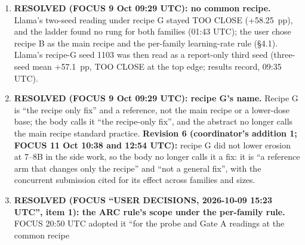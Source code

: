 \documentclass{article}
\theoremstyle{plain}
\theoremstyle{definition}
\theoremstyle{remark}
\begin{document}
\begin{enumerate}
        reports it as a pre-registered prediction that failed''. Revision 4 puts
        its result in \S{}5 (placeholder) and names the run in \S{}4.1 and
        \S{}4.10. Decide whether \S{}5 gives it a sentence or a row in the dose
        table, and whether the mechanism side study keeps any recipe contrast.
        Revision 4 keeps the recipe contrast only as a dose decomposition, not
        as a mechanism test. \textbf{Revision 5:} recipe G is now a reference
        arm, and the token-mean-only run explains that reference's effect on
        OLMo; \S{}4.10 item 2 and \S{}5 keep it. Decide whether \S{}5 gives it a
        sentence or a row beside recipe G. \textbf{Revision 6 (overlap rule):}
        the token-mean-only run is reported by the concurrent submission;
        \S{}4.10 item 2 cites it and \S{}5's placeholder no longer lists it.
        Decide whether the main paper still states this failed pre-registered
        prediction itself (FOCUS 8 Oct 21:36 UTC: ``the paper reports it as a
        pre-registered prediction that failed''), or only through the citation.
  \item \textbf{RESOLVED (FOCUS 9 Oct 09:29 UTC): no common recipe.} Llama's
        two-seed reading under recipe G stayed TOO CLOSE (+58.25~pp), and the
        ladder found no rung for both families (01:43 UTC); the user chose
        recipe B as the main recipe and the per-family learning-rate rule
        (\S{}4.1). Llama's recipe-G seed 1103 was then read as a report-only
        third seed (three-seed mean +57.1~pp, TOO CLOSE at the top edge; results
        record, 09:35 UTC).
  \item \textbf{RESOLVED (FOCUS 9 Oct 09:29 UTC): recipe G's name.} Recipe G is
        ``the recipe only fix'' and a reference, not the main recipe or a
        lower-dose base; the body calls it ``the recipe-only fix'', and the
        abstract no longer calls the main recipe standard practice.
        \textbf{Revision 6 (coordinator's addition 1; FOCUS 11 Oct 10:38 and
        12:54 UTC):} recipe G did not lower erosion at 7--8B in the side work,
        so the body no longer calls it a fix: it is ``a reference arm that
        changes only the recipe'' and ``not a general fix'', with the concurrent
        submission cited for its effect across families and sizes.
  \item \textbf{RESOLVED (FOCUS ``USER DECISIONS, 2026-10-09 15:23 UTC'', item
        1): the ARC rule's scope under the per-family rule.} FOCUS 20:50 UTC
        adopted it ``for the probe and Gate A readings at the common recipe

\end{enumerate}
\end{document}
